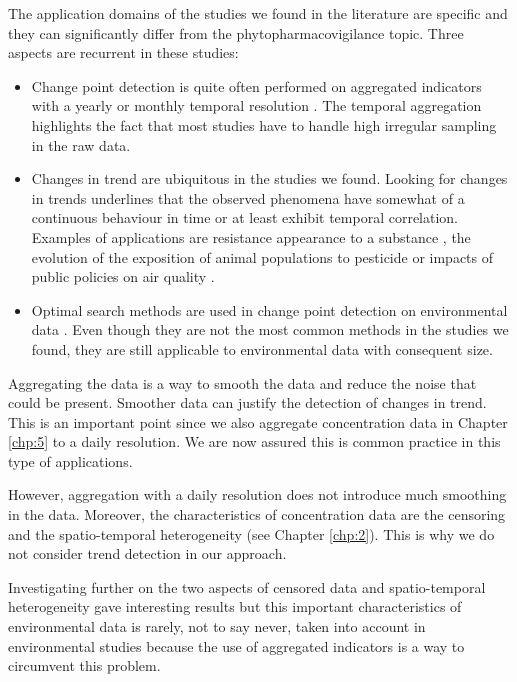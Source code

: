 The application domains of the studies we found in the literature are specific  and they can significantly differ from the phytopharmacovigilance topic. Three aspects are recurrent in these studies: 
\begin{itemize}
\item Change point detection is quite often performed on aggregated indicators with a yearly or monthly temporal resolution \citep{Ko2017,Ryberg2020,FOMBY2006}. The temporal aggregation highlights the fact that most studies have to handle high irregular sampling in the raw data. 
\item Changes in trend are ubiquitous in the studies we found. Looking for changes in trends underlines that the observed phenomena have somewhat of a continuous behaviour in time or at least exhibit temporal correlation. Examples of applications are resistance appearance to a substance \citep{Solla2010}, the evolution of the exposition of animal populations to pesticide \citep{Menger2022} or impacts of public policies on air quality \citep{FOMBY2006}.
\item Optimal search methods are used in change point detection on environmental data \citep{BUNCE_2018,Ryberg2020}. Even though they are not the most common methods in the studies we found, they are still applicable to environmental data with consequent size. 
\end{itemize}

Aggregating the data is a way to smooth the data and reduce the noise that could be present. Smoother data can justify the detection of changes in trend. This is an important point since we also aggregate concentration data in Chapter \ref{chp:5} to a daily resolution. We are now assured this is common practice in this type of applications. 

However, aggregation with a daily resolution does not introduce much smoothing in the data. Moreover, the characteristics of concentration data are the censoring and the spatio-temporal heterogeneity (see Chapter \ref{chp:2}). This is why we do not consider trend detection in our approach.

Investigating further on the two aspects of censored data and spatio-temporal heterogeneity gave interesting results but this important characteristics of environmental data is rarely, not to say never, taken into account in environmental studies because the use of aggregated indicators is a way to circumvent this problem. 

